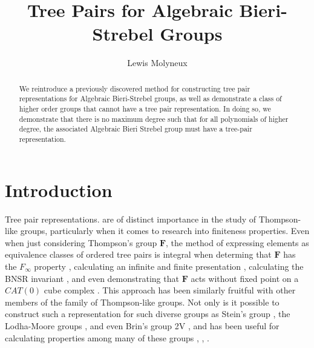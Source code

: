 \documentclass[
11pt, %
english, %
singlespacing, %
parskip, %
headsepline, %
]{amsart} %
\theoremstyle{definition}
\newcommand{\TF}{\textbf{F}}
\begin{document}
\title[Tree Pairs for Algebraic Bieri-Strebel Groups]{Tree Pairs for Algebraic Bieri-Strebel Groups}

\author[L.~Molyneux]{Lewis Molyneux}
\address{
Royal Holloway, University of London\\ 
Department of Mathematics, McCrea Building, TW20~0EX Egham, UK}




\begin{abstract}
We reintroduce a previously discovered method for constructing tree pair representations for Algebraic Bieri-Strebel groups, as well as demonstrate a class of higher order groups that cannot have a tree pair representation. In doing so, we demonstrate that there is no maximum degree such that for all polynomials of higher degree, the associated Algebraic Bieri Strebel group must have a tree-pair representation.
\end{abstract}


\maketitle

\section{Introduction}

Tree pair representations. are of distinct importance in the study of Thompson-like groups, particularly when it comes to research into finiteness properties. Even when just considering Thompson's group $\TF$, the method of expressing elements as equivalence classes of ordered tree pairs is integral when determing that $\TF$ has the $F_\infty$ property \cite{Brown} \cite{ZarAccount}, calculating an infinite and finite presentation \cite{CFP} \cite{Fbook}, calculating the BNSR invariant \cite{Witzel}, and even demonstrating that $\TF$ acts without fixed point on a $CAT(0)$ cube complex \cite{Farley}. This approach has been similarly fruitful with other members of the family of Thompson-like groups. Not only is it possible to construct such a representation for such diverse groups as Stein's group \cite{Stein}, the Lodha-Moore groups \cite{LMbook}, and even Brin's group 2V \cite{2V}, and has been useful for calculating properties among many of these groups \cite{F23}, \cite{Zaremsky}, \cite{Wladis}.
\end{document}
